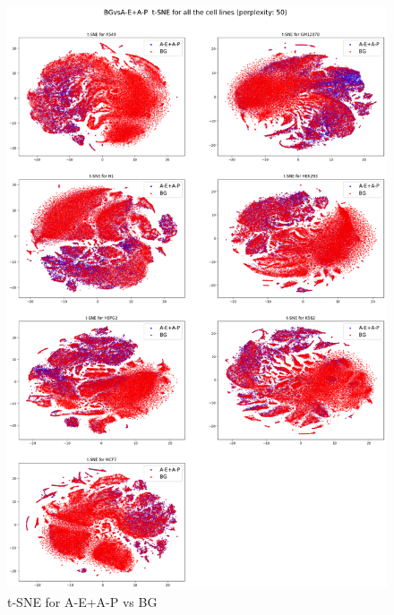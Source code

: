 \begin{figure}[h]
\centering
\includegraphics[width=12cm]{images/tsne_decomp_plots/20200410-232607_BGvsA-E+A-P_tsne_plot.png}
\caption{t-SNE for A-E+A-P vs BG}
\label{fig:tsneAE+APvsBG}
\end{figure}